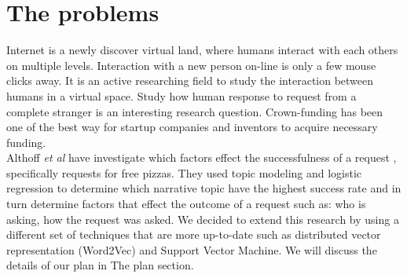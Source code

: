 \section{The problems}

Internet is a newly discover virtual land, where humans interact with each others on multiple levels. Interaction with a new person on-line is only a few mouse clicks away. It is an active researching field to study the interaction between humans in a virtual space. Study how human response to request from a complete stranger is an interesting research question. Crown-funding has been one of the best way for startup companies and inventors to acquire necessary funding.\\

Althoff \emph{et al} have investigate which factors effect the successfulness of a request \cite{tim14}, specifically requests for free pizzas. They used topic modeling and logistic regression to determine which narrative topic have the highest success rate and in turn determine factors that effect the outcome of a request such as: who is asking, how the request was asked. We decided to extend this research by using a different set of techniques that are more up-to-date such as distributed vector representation (Word2Vec\cite{word2vec}) and Support Vector Machine. We will discuss the details of our plan in The plan section.\\

